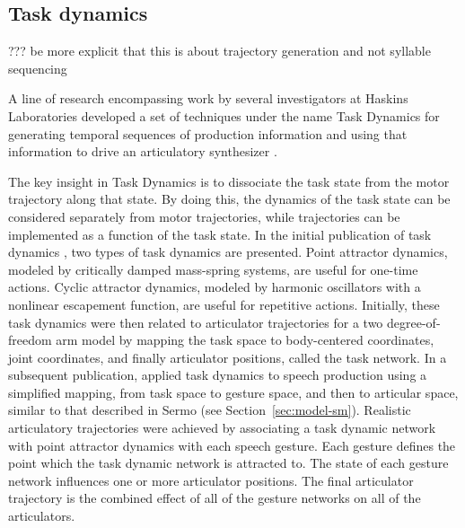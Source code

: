 \subsection{Task dynamics}

??? be more explicit that this is about
trajectory generation and not syllable
sequencing

A line of research encompassing work by
several investigators at Haskins Laboratories
developed a set of techniques
under the name Task Dynamics
for generating temporal sequences
of production information
and using that information to drive
an articulatory synthesizer \citep{nam2004}.

The key insight in Task Dynamics
is to dissociate the task state
from the motor trajectory
along that state.
By doing this, the dynamics of the task state
can be considered separately from motor trajectories,
while trajectories can be implemented
as a function of the task state.
In the initial publication of task dynamics
\citep{saltzman1987},
two types of task dynamics are presented.
Point attractor dynamics,
modeled by critically damped mass-spring systems,
are useful for one-time actions.
Cyclic attractor dynamics,
modeled by harmonic oscillators
with a nonlinear escapement function,
are useful for repetitive actions.
Initially, these task dynamics were then
related to articulator trajectories
for a two degree-of-freedom arm model
by mapping the task space
to body-centered coordinates,
joint coordinates,
and finally articulator positions,
called the task network.
In a subsequent publication,
\citet{saltzman1989}
applied task dynamics to speech production
using a simplified mapping,
from task space
to gesture space,
and then to articular space,
similar to that described in Sermo
(see Section~\ref{sec:model-sm}).
Realistic articulatory trajectories
were achieved
by associating a task dynamic network
with point attractor dynamics
with each speech gesture.
Each gesture defines
the point which the task dynamic network
is attracted to.
The state of each gesture network
influences one or more articulator positions.
The final articulator trajectory
is the combined effect
of all of the gesture networks
on all of the articulators.

